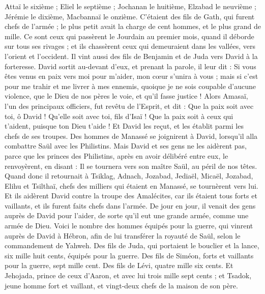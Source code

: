 \begin{multicols}{2}
Attaï le sixième ; Eliel le septième ;
Jochanan le huitième, Elzabad le neuvième ;
Jérémie le dixième, Macbannaï le onzième.
C'étaient des fils de Gath, qui furent chefs de l'armée ; le plus petit avait la charge de cent hommes, et le plus grand de mille.
Ce sont ceux qui passèrent le Jourdain au premier mois, quand il déborde sur tous ses rivages ; et ils chassèrent ceux qui demeuraient dans les vallées, vers l'orient et l'occident.
Il vint aussi des fils de Benjamin et de Juda vers David à la forteresse.
David sortit au-devant d'eux, et prenant la parole, il leur dit : Si vous êtes venus en paix vers moi pour m'aider, mon cœur s'unira à vous ; mais si c'est pour me trahir et me livrer à mes ennemis, quoique je ne sois coupable d'aucune violence, que le Dieu de nos pères le voie, et qu'il fasse justice !
Alors Amasaï, l'un des principaux officiers, fut revêtu de l'Esprit, et dit : Que la paix soit avec toi, ô David ! Qu'elle soit avec toi, fils d'Isaï ! Que la paix soit à ceux qui t'aident, puisque ton Dieu t'aide ! Et David les reçut, et les établit parmi les chefs de ses troupes.
Des hommes de Manassé se joignirent à David, lorsqu'il alla combattre Saül avec les Philistins. Mais David et ses gens ne les aidèrent pas, parce que les princes des Philistins, après en avoir délibéré entre eux, le renvoyèrent, en disant : Il se tournera vers son maître Saül, au péril de nos têtes.
Quand donc il retournait à Tsiklag, Adnach, Jozabad, Jediaël, Micaël, Jozabad, Elihu et Tsilthaï, chefs des milliers qui étaient en Manassé, se tournèrent vers lui.
Et ils aidèrent David contre la troupe des Amalécites, car ils étaient tous forts et vaillants, et ils furent faits chefs dans l'armée.
De jour en jour, il venait des gens auprès de David pour l'aider, de sorte qu'il eut une grande armée, comme une armée de Dieu.
Voici le nombre des hommes équipés pour la guerre, qui vinrent auprès de David à Hébron, afin de lui transférer la royauté de Saül, selon le commandement de Yahweh.
Des fils de Juda, qui portaient le bouclier et la lance, six mille huit cents, équipés pour la guerre.
Des fils de Siméon, forts et vaillants pour la guerre, sept mille cent.
Des fils de Lévi, quatre mille six cents.
Et Jehojada, prince de ceux d'Aaron, et avec lui trois mille sept cents ;
et Tsadok, jeune homme fort et vaillant, et vingt-deux chefs de la maison de son père.

\end{multicols}

